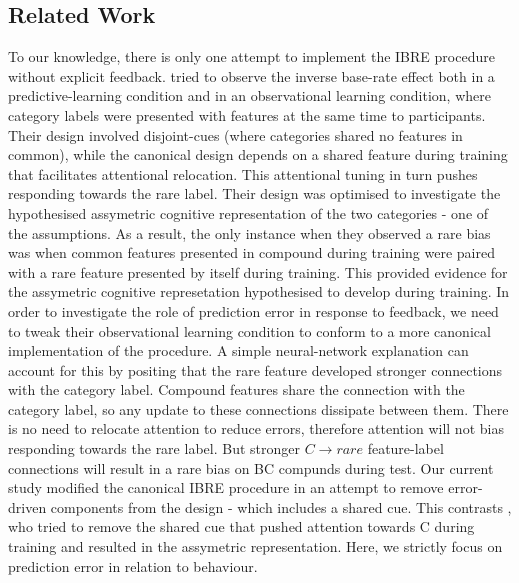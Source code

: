 \documentclass[10pt,letterpaper]{article}
\begin{document}
\subsection*{Related Work}

To our knowledge, there is only one attempt to implement the IBRE procedure without explicit feedback.
 tried to observe the inverse base-rate effect both in a predictive-learning condition and in an observational learning condition, where category labels were presented with features at the same time to participants.
Their design involved disjoint-cues (where categories shared no features in common), while the canonical design depends on a shared feature during training that facilitates attentional relocation.
This attentional tuning in turn pushes responding towards the rare label.
Their design was optimised to investigate the hypothesised assymetric cognitive representation of the two categories - one of the assumptions.
As a result, the only instance when they observed a rare bias was when common features presented in compound during training were paired with a rare feature presented by itself during training.
This provided evidence for the assymetric cognitive represetation hypothesised to develop during training.
In order to investigate the role of prediction error in response to feedback, we need to tweak their observational learning condition to conform to a more canonical implementation of the procedure.
A simple neural-network explanation can account for this by positing that the rare feature developed stronger connections with the category label.
Compound features share the connection with the category label, so any update to these connections dissipate between them.
There is no need to relocate attention to reduce errors, therefore attention will not bias responding towards the rare label.
But stronger $C \to rare$ feature-label connections will result in a rare bias on BC compunds during test.
Our current study modified the canonical IBRE procedure in an attempt to remove error-driven components from the design - which includes a shared cue.
This contrasts , who tried to remove the shared cue that pushed attention towards C during training and resulted in the assymetric representation.
Here, we strictly focus on prediction error in relation to behaviour.
\end{document}
